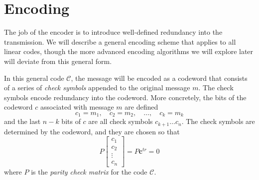 \documentclass[12pt,twoside]{reedthesis}
\theoremstyle{definition}
\begin{document}
\section{Encoding}
The job of the encoder is to introduce well-defined redundancy into the transmission. We will describe a general encoding scheme that applies to all linear codes, though the more advanced encoding algorithms we will explore later will deviate from this general form.

In this general code $\mathscr{C}$, the message will be encoded as a codeword that consists of a series of \textit{check symbols} appended to the original message $m$. The check symbols encode redundancy into the codeword. More concretely, the bits of the codeword $c$ associated with message $m$ are defined
\begin{equation*}
c_1 = m_1, \quad c_2 = m_2, \quad \ldots,\quad c_k = m_k
\end{equation*}
and the last $n-k$ bits of $c$ are all check symbols $c_{k+1} \ldots c_n$. The check symbols are determined by the codeword, and they are chosen so that 
\begin{equation*}
P \begin{bmatrix}
c_{1}\\
c_{2}\\
\vdots\\
c_n
\end{bmatrix} = 
P \mathbf{c}^{tr}= 0
\end{equation*}
where $P$ is the \textit{parity check matrix} for the code $\mathscr{C}$.
\end{document}

